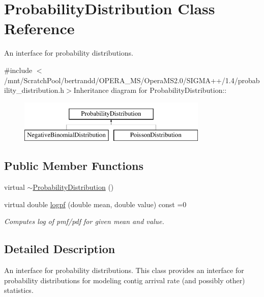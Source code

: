 \hypertarget{classProbabilityDistribution}{
\section{ProbabilityDistribution Class Reference}
\label{classProbabilityDistribution}
}


An interface for probability distributions.  


{\ttfamily \#include $<$/mnt/ScratchPool/bertrandd/OPERA\_\-MS/OperaMS2.0/SIGMA++/1.4/probability\_\-distribution.h$>$}Inheritance diagram for ProbabilityDistribution::\begin{figure}[H]
\begin{center}
\leavevmode
\includegraphics[height=2cm]{classProbabilityDistribution}
\end{center}
\end{figure}
\subsection*{Public Member Functions}
\begin{DoxyCompactItemize}
\item 
virtual \hyperlink{classProbabilityDistribution_acb6a9c2d551cdfe6000b9b092b35a0d1}{$\sim$ProbabilityDistribution} ()
\item 
virtual double \hyperlink{classProbabilityDistribution_a9ac2ee460523d2e8f77e7541c9d40ef7}{logpf} (double mean, double value) const =0
\begin{DoxyCompactList}\small\item\em Computes log of pmf/pdf for given mean and value. \item\end{DoxyCompactList}\end{DoxyCompactItemize}


\subsection{Detailed Description}
An interface for probability distributions. This class provides an interface for probability distributions for modeling contig arrival rate (and possibly other) statistics. 

